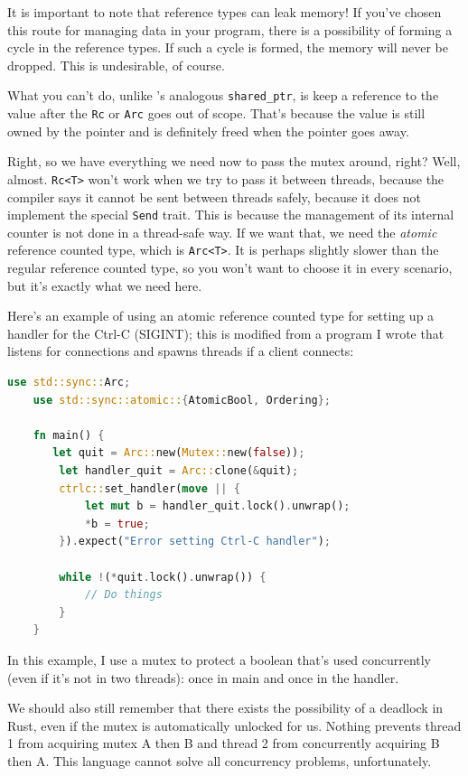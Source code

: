 It is important to note that reference types can leak memory! If you've chosen this route for managing data in your program, there is a possibility of forming a cycle in the reference types. If such a cycle is formed, the memory will never be dropped. This is undesirable, of course.

What you can't do, unlike \CPP's analogous \texttt{shared\_ptr}, is keep a reference to the value after the \texttt{Rc} or \texttt{Arc} goes out of scope. That's because the value is still owned by the pointer and is definitely freed when the pointer goes away.

Right, so we have everything we need now to pass the mutex around, right? Well, almost. \texttt{Rc<T>} won't work when we try to pass it between threads, because the compiler says it cannot be sent between threads safely, because it does not implement the special \texttt{Send} trait. This is because the management of its internal counter is not done in a thread-safe way. If we want that, we need the \textit{atomic} reference counted type, which is \texttt{Arc<T>}. It is perhaps slightly slower than the regular reference counted type, so you won't want to choose it in every scenario, but it's exactly what we need here.

Here's an example of using an atomic reference counted type for setting up a handler for the Ctrl-C (SIGINT); this is modified from a program I wrote that listens for connections and spawns threads if a client connects: 

\begin{lstlisting}[language=Rust]
    use std::sync::Arc;
    use std::sync::atomic::{AtomicBool, Ordering};

    fn main() {
       let quit = Arc::new(Mutex::new(false));
        let handler_quit = Arc::clone(&quit);
        ctrlc::set_handler(move || {
            let mut b = handler_quit.lock().unwrap();
            *b = true;
        }).expect("Error setting Ctrl-C handler");
     
        while !(*quit.lock().unwrap()) {
        	// Do things
        }
    }
\end{lstlisting}

In this example, I use a mutex to protect a boolean that's used concurrently (even if it's not in two threads): once in main and once in the handler. 

We should also still remember that there exists the possibility of a deadlock in Rust, even if the mutex is automatically unlocked for us. Nothing prevents thread 1 from acquiring mutex A then B and thread 2 from concurrently acquiring B then A. This language cannot solve all concurrency problems, unfortunately.

